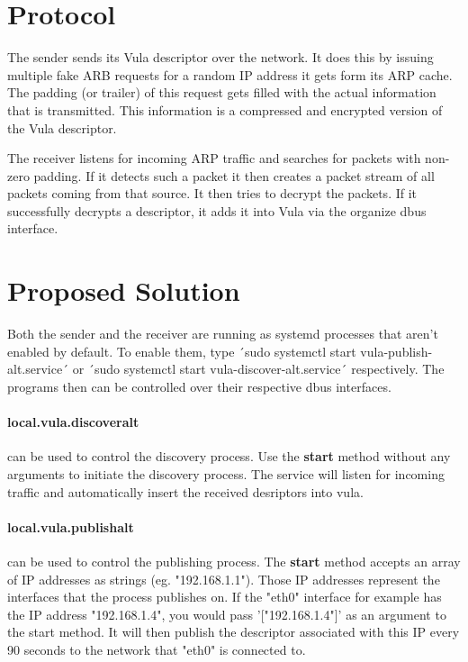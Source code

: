 \documentclass[a4paper,11pt]{report}
\begin{document}
\chapter{Protocol}
The sender sends its Vula descriptor over the network. It does this by issuing multiple fake ARB requests for a random IP address it gets form its ARP cache. The padding (or trailer) of this request gets filled with the actual information that is transmitted. This information is a compressed and encrypted version of the Vula descriptor.

The receiver listens for incoming ARP traffic and searches for packets with non-zero padding. If it detects such a packet it then creates a packet stream of all packets coming from that source. It then tries to decrypt the packets. If it successfully decrypts a descriptor, it adds it into Vula via the organize dbus interface.

\chapter{Proposed Solution}
Both the sender and the receiver are running as systemd processes that aren't enabled by default. To enable them, type ´sudo systemctl start vula-publish-alt.service´ or ´sudo systemctl start vula-discover-alt.service´ respectively. The programs then can be controlled over their respective dbus interfaces.

\subsubsection{local.vula.discoveralt} can be used to control the discovery process. Use the \textbf{start} method without any arguments to initiate the discovery process. The service will listen for incoming traffic and automatically insert the received desriptors into vula.


\subsubsection{local.vula.publishalt} can be used to control the publishing process. The \textbf{start} method accepts an array of IP addresses as strings (eg. "192.168.1.1"). Those IP addresses represent the interfaces that the process publishes on.
If the "eth0" interface for example has the IP address "192.168.1.4", you would pass '["192.168.1.4"]' as an argument to the start method. 
It will then publish the descriptor associated with this IP every 90 seconds to the network that "eth0" is connected to.
\end{document}
